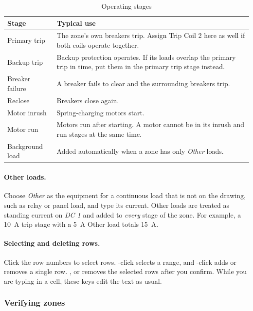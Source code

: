 \begin{table}[H]
  \centering
  \caption{Operating stages}
  \label{tab:stages}
  \begin{tabularx}{\textwidth}{l L}
    \toprule
    \textbf{Stage} & \textbf{Typical use} \\
    \midrule
    Primary trip & The zone's own breakers trip. Assign Trip Coil 2 here as well if both coils operate together. \\
    Backup trip & Backup protection operates. If its loads overlap the primary trip in time, put them in the primary trip stage instead. \\
    Breaker failure & A breaker fails to clear and the surrounding breakers trip. \\
    Reclose & Breakers close again. \\
    Motor inrush & Spring-charging motors start. \\
    Motor run & Motors run after starting. A motor cannot be in its inrush and run stages at the same time. \\
    Background load & Added automatically when a zone has only \emph{Other} loads. \\
    \bottomrule
  \end{tabularx}
\end{table}

\paragraph{Other loads.} Choose \emph{Other} as the equipment for a continuous load
that is not on the drawing, such as relay or panel load, and type its current. Other
loads are treated as standing current on \emph{DC 1} and added to \emph{every} stage of
the zone. For example, a \SI{10}{A} trip stage with a \SI{5}{A} Other load totals
\SI{15}{A}.


\paragraph{Selecting and deleting rows.} Click the row numbers to select rows.
-click selects a range, and -click adds or removes a single
row. ,  or  removes the
selected rows after you confirm. While you are typing in a cell, these keys edit the
text as usual.

\subsubsection{Verifying zones}

